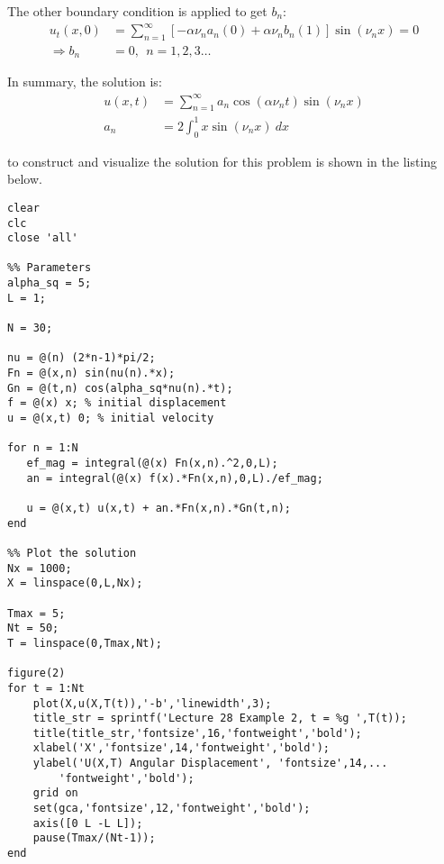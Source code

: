 \vspace{0.25cm}

\noindent The other boundary condition is applied to get $b_n$:
\begin{align*}
u_t(x,0) &= \sum\limits_{n=1}^{\infty} \left[-\alpha \nu_n a_n (0) + \alpha \nu_n b_n(1)\right]\sin{(\nu_n x)} = 0 \\
\Rightarrow b_n &= 0, \ \ n=1,2,3\dots
\end{align*}

\noindent In summary, the solution is:
\begin{align*}
u(x,t) &= \sum\limits_{n=1}^{\infty} a_n \cos{(\alpha \nu_n t)}\sin{(\nu_n x)} \\
a_n &= 2 \int_0^1 x \sin{(\nu_n x)} \ dx
\end{align*}

 to construct and visualize the solution for this problem is shown in the listing below.

\begin{lstlisting}[name=lec28-ex2, style=myMatlab]
clear
clc
close 'all'

%% Parameters
alpha_sq = 5;
L = 1;

N = 30;

nu = @(n) (2*n-1)*pi/2;
Fn = @(x,n) sin(nu(n).*x);
Gn = @(t,n) cos(alpha_sq*nu(n).*t);
f = @(x) x; % initial displacement
u = @(x,t) 0; % initial velocity

for n = 1:N
   ef_mag = integral(@(x) Fn(x,n).^2,0,L);
   an = integral(@(x) f(x).*Fn(x,n),0,L)./ef_mag;
   
   u = @(x,t) u(x,t) + an.*Fn(x,n).*Gn(t,n);
end

%% Plot the solution
Nx = 1000;
X = linspace(0,L,Nx);

Tmax = 5;
Nt = 50;
T = linspace(0,Tmax,Nt);

figure(2)
for t = 1:Nt
    plot(X,u(X,T(t)),'-b','linewidth',3);
    title_str = sprintf('Lecture 28 Example 2, t = %g ',T(t));
    title(title_str,'fontsize',16,'fontweight','bold');
    xlabel('X','fontsize',14,'fontweight','bold');
    ylabel('U(X,T) Angular Displacement', 'fontsize',14,...
        'fontweight','bold');
    grid on
    set(gca,'fontsize',12,'fontweight','bold');
    axis([0 L -L L]);
    pause(Tmax/(Nt-1));    
end
\end{lstlisting}

